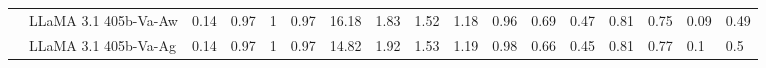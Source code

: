 \begin{table*}[t]
{\begin{tabular}{@{}ll|llll|llll|lll|ll|ll@{}}
                           & LLaMA 3.1 405b-Va-Aw & 0.14                                                                    & 0.97                                                                     & 1                                                                     & 0.97                                                                  & 16.18                                                                   & 1.83                                                                  & 1.52                                                                  & 1.18                                                                   & 0.96                                                                    & 0.69                                                                  & 0.47                                                                   & 0.81                                                                   & 0.75                                                                   & 0.09                                                                     & 0.49                                                                     \\
                           & LLaMA 3.1 405b-Va-Ag & 0.14                                                                    & 0.97                                                                     & 1                                                                     & 0.97                                                                  & 14.82                                                                   & 1.92                                                                  & 1.53                                                                  & 1.19                                                                   & 0.98                                                                    & 0.66                                                                  & 0.45                                                                   & 0.81                                                                   & 0.77                                                                   & 0.1                                                                      & 0.5                                                                      \\

\end{tabular}}
\end{table*}
